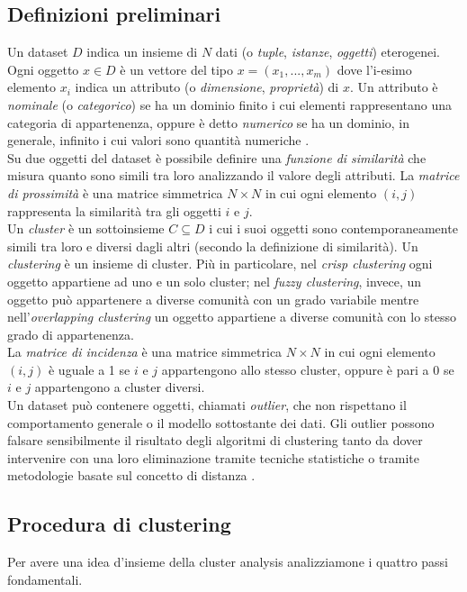 \subsection{Definizioni preliminari}
Un dataset $ D $ indica un insieme di $ N $ dati (o \textit{tuple}, \textit{istanze}, \textit{oggetti}) eterogenei. Ogni oggetto $ x \in D $ \`e un vettore del tipo $ x = (x_{1},..., x_{m}) $ dove l'i-esimo elemento $ x_{i} $ indica un attributo (o \textit{dimensione}, \textit{propriet\`a}) di $ x $. Un attributo \`e \textit{nominale} (o \textit{categorico}) se ha un dominio finito i cui elementi rappresentano una categoria di appartenenza, oppure \`e detto \textit{numerico} se ha un dominio, in generale, infinito i cui valori sono quantit\`a numeriche \cite{Han2011}.\\
Su due oggetti del dataset \`e possibile definire una \textit{funzione di similarit\`a} che misura quanto sono simili tra loro analizzando il valore degli attributi. La \textit{matrice di prossimit\`a} \`e una matrice simmetrica $ N \times N $ in cui ogni elemento $ (i,j) $ rappresenta la similarit\`a tra gli oggetti $ i $ e $ j $.\\
Un \textit{cluster} \`e un sottoinsieme $ C \subseteq D $ i cui i suoi oggetti sono contemporaneamente simili tra loro e diversi dagli altri (secondo la definizione di similarit\`a). Un \textit{clustering} \`e un insieme di cluster. Pi\`u in particolare, nel \textit{crisp clustering} ogni oggetto appartiene ad uno e un solo cluster; nel \textit{fuzzy clustering}, invece, un oggetto pu\`o appartenere a diverse comunit\`a con un grado variabile mentre nell'\textit{overlapping clustering} un oggetto appartiene a diverse comunit\`a con lo stesso grado di appartenenza.\\
La \textit{matrice di incidenza} \`e una matrice simmetrica $ N \times N $ in cui ogni elemento $ (i, j) $ \`e uguale a 1 se $ i $ e $ j $ appartengono allo stesso cluster, oppure \`e pari a 0 se $ i $ e $ j $ appartengono a cluster diversi.\\
Un dataset pu\`o contenere oggetti, chiamati \textit{outlier}, che non rispettano il comportamento generale o il modello sottostante dei dati. Gli outlier possono falsare sensibilmente il risultato degli algoritmi di clustering tanto da dover intervenire con una loro eliminazione tramite tecniche statistiche o tramite metodologie basate sul concetto di distanza \cite{Han2011}.

\subsection{Procedura di clustering}
Per avere una idea d'insieme della cluster analysis analizziamone i quattro passi fondamentali.

